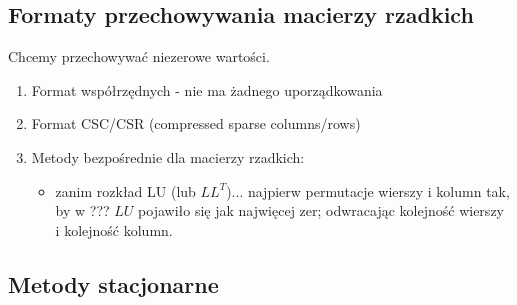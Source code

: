 \documentclass[hidelinks,a4paper]{article}
\begin{document}
\subsection{Formaty przechowywania macierzy rzadkich}

Chcemy przechowywać niezerowe wartości.

\begin{enumerate}
	\item Format współrzędnych - nie ma żadnego uporządkowania
	      	
	\item Format CSC/CSR (compressed sparse columns/rows)
	      
	\item Metody bezpośrednie dla macierzy rzadkich:
	      \begin{itemize}
	      	\item zanim rozkład LU (lub $LL^T$)... najpierw permutacje wierszy i kolumn tak, by w ??? $LU$ pojawiło się jak najwięcej zer;
	      	      odwracając kolejność wierszy i kolejność kolumn.
	      \end{itemize}
\end{enumerate}


\subsection{Metody stacjonarne}
\end{document}
